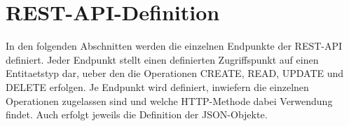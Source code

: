 \chapter{REST-API-Definition}
\label{sec:RESTAPIDefinition}

In den folgenden Abschnitten werden die einzelnen Endpunkte der REST-API definiert.
Jeder Endpunkt stellt einen definierten Zugriffspunkt auf einen Entitaetstyp dar, ueber den die Operationen CREATE, READ, UPDATE und DELETE erfolgen. 
Je Endpunkt wird definiert, inwiefern die einzelnen Operationen zugelassen sind und welche HTTP-Methode dabei Verwendung findet. 
Auch erfolgt jeweils die Definition der JSON-Objekte.






